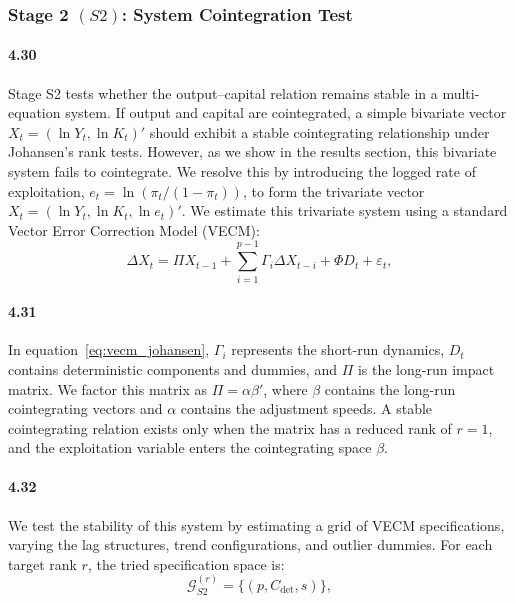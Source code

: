 \subsubsection{Stage 2 \texorpdfstring{$(S2)$}{}: System Cointegration Test}
\label{subsec:S2_system}

\paragraph{4.30}
Stage S2 tests whether the output--capital relation remains stable in a multi-equation system. If output and capital are cointegrated, a simple bivariate vector $X_t = (\ln Y_t, \ln K_t)'$ should exhibit a stable cointegrating relationship under Johansen's rank tests. However, as we show in the results section, this bivariate system fails to cointegrate. We resolve this by introducing the logged rate of exploitation, $e_t = \ln(\pi_t / (1 - \pi_t))$, to form the trivariate vector $X_t = (\ln Y_t, \ln K_t, \ln e_t)'$. We estimate this trivariate system using a standard Vector Error Correction Model (VECM):
\begin{equation}
\label{eq:vecm_johansen}
\Delta X_t = \Pi X_{t-1} + \sum_{i=1}^{p-1} \Gamma_i \Delta X_{t-i} + \Phi D_t + \varepsilon_t,
\end{equation}

\paragraph{4.31}
In equation~\eqref{eq:vecm_johansen}, $\Gamma_i$ represents the short-run dynamics, $D_t$ contains deterministic components and dummies, and $\Pi$ is the long-run impact matrix. We factor this matrix as $\Pi = \alpha \beta'$, where $\beta$ contains the long-run cointegrating vectors and $\alpha$ contains the adjustment speeds. A stable cointegrating relation exists only when the matrix has a reduced rank of $r=1$, and the exploitation variable enters the cointegrating space $\beta$.

\paragraph{4.32}
We test the stability of this system by estimating a grid of VECM specifications, varying the lag structures, trend configurations, and outlier dummies. For each target rank $r$, the tried specification space is:
\begin{equation}
\mathcal{G}_{S2}^{(r)} = \{(p, C_{\text{det}}, s)\},
\label{eq:G_S2}
\end{equation}

